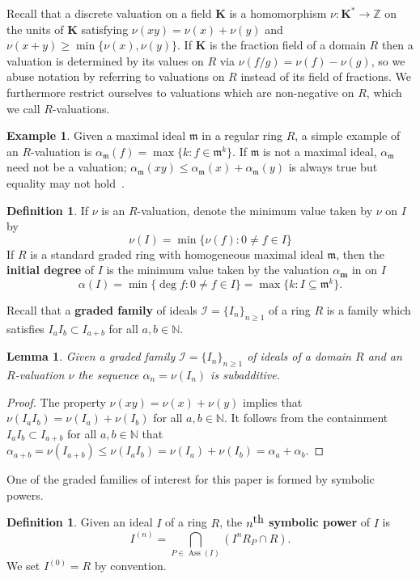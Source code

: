 \documentclass[12pt, reqno]{amsart}
\numberwithin{equation}{section}
\def\a{\ensuremath{\alpha}}
\newcommand{\fm}{{\mathfrak m}}
\newcommand{\N}{{\mathbb N}}
\newcommand{\Z}{{\mathbb Z}}
\newcommand{\m}{\mathbf{m}}
\def\Ass{\operatorname{Ass}}
\theoremstyle{plain} %
\newtheorem{lem}[thm]{Lemma}
\theoremstyle{definition}
\newtheorem{defn}[thm]{Definition}
\newtheorem{ex}[thm]{Example}
\theoremstyle{remark}
\begin{document}
Recall that a discrete valuation on a field $\mathbf{K}$ is a homomorphism $\nu:\mathbf{K}^*\to\Z$ on the units of $\mathbf{K}$ satisfying $\nu(xy) = \nu(x) + \nu(y)$ and $\nu(x + y) \geq \min\{\nu(x), \nu(y)\}$.  If $\mathbf{K}$ is the fraction field of a domain $R$ then a valuation is determined by its values on $R$ via $\nu(f/g)=\nu(f)-\nu(g)$, so we abuse notation by referring to valuations on $R$ instead of its field of fractions.  We furthermore restrict ourselves to valuations which are non-negative on $R$, which we call $R$-valuations.  
\begin{ex}
\label{ex:am}
Given a maximal ideal $\mathfrak{m}$ in a regular ring $R$, a simple example of an $R$-valuation is 
$\alpha_{\mathfrak{m}}(f)=\max\{k:f\in\mathfrak{m}^k\}$.  If $\fm$ is not a maximal ideal, $\alpha_{\fm}$ need not be a valuation; $\alpha_{\fm}(xy)\le \alpha_{\fm}(x)+\alpha_{\fm}(y)$ is always true but equality may not hold~\cite[Section~6.7]{HS06}.
\end{ex}
\begin{defn}
If $\nu$ is an $R$-valuation, denote  the minimum value taken by $\nu$ on $I$ by 
\[
\nu(I)=\min\{\nu(f) : 0\neq f\in I\}
\]
If $R$ is a standard graded ring with homogeneous maximal ideal $\mathfrak{m}$, then the {\bf initial degree} of $I$ is the minimum value taken by the valuation $\a_\m$ in  on $I$
  \[
  \alpha(I)=\min\{\deg{f}: 0\neq f\in I\}=\max\{k:I\subseteq \mathfrak{m}^k\}.
  \]
\end{defn}

Recall that a {\bf graded family} of ideals $\mathcal{I}=\{I_n\}_{n\geq 1}$ of a ring $R$ is a family which satisfies $I_aI_b\subset I_{a+b}$ for all $a,b\in\N$.

\begin{lem}\label{lem:WaldSub}
Given a graded family $\mathcal{I}=\{I_n\}_{n\geq 1}$ of  ideals of a domain $R$ and an $R$-valuation $\nu$ the sequence  $\alpha_n=\nu(I_n)$ is subadditive.
\end{lem}
\begin{proof}
The property $\nu(xy) = \nu(x) + \nu(y)$  implies that $\nu(I_aI_b)=\nu(I_a)+\nu(I_b)$ for all $a,b\in \N$.
It follows from the containment $I_aI_b\subset I_{a+b}$ for all $a,b\in\N$ that $\alpha_{a+b}=\nu(I_{a+b})\leq \nu(I_aI_b)=\nu(I_a)+\nu(I_b)=\alpha_a+\alpha_b$.
\end{proof}

One of the graded families of interest for this paper is formed by symbolic powers.

 \begin{defn}
  Given an ideal $I$ of a ring $R$, 
  the $n^{\mbox{\footnotesize{th}}}$ \textbf{symbolic power} of $I$ is 
  \[
   I^{(n)}=\bigcap_{P\in \Ass(I)} \left(I^nR_{P}\cap R\right).
  \]  We set $I^{(0)}=R$ by convention.
  \end{defn}
  
\end{document}
